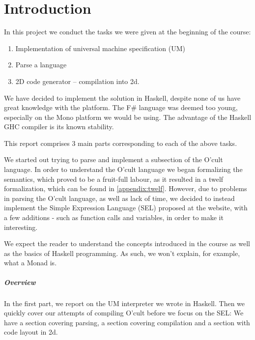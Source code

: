 \chapter*{Introduction}

In this project we conduct the tasks we were given at the beginning of
the course:
\begin{enumerate}
\item Implementation of universal machine specification (UM)
\item Parse a language
\item 2D code generator -- compilation into 2d.
\end{enumerate}
We have decided to implement the solution in Haskell, despite none of
us have great knowledge with the platform. The F\# language was deemed
too young, especially on the Mono platform we would be using. The
advantage of the Haskell GHC compiler is its known stability.

This report comprises 3 main parts corresponding to each of the
above tasks.

We started out trying to parse and implement a subsection of the O'cult
language. In order to understand the O'cult language we began
formalizing the semantics, which proved to be a fruit-full labour, as
it resulted in a twelf formalization, which can be found in
\ref{appendix:twelf}. However, due to problems in parsing the O'cult
language, as well as lack of time, we decided to instead implement the
Simple Expression Language (SEL) proposed at the website, with a few
additions - such as function calls and variables, in order to make it interesting.

We expect the reader to understand the concepts introduced in the
course as well as the basics of Haskell programming. As such, we won't
explain, for example, what a Monad is.

\paragraph{Overview}
In the first part, we report on the UM interpreter we wrote in
Haskell. Then we quickly cover our attempts of compiling O'cult before
we focus on the SEL: We have a section covering parsing, a section
covering compilation and a section with code layout in 2d.

